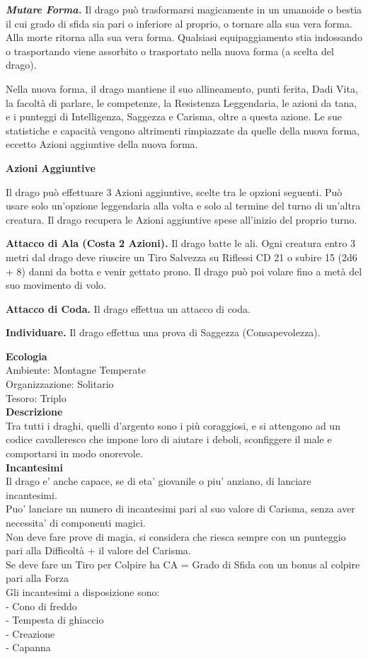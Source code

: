 \begin{multicols}{2}
\emph{\textbf{Mutare Forma.}} Il drago può trasformarsi magicamente in un umanoide o bestia il cui grado di sfida sia pari o inferiore al proprio, o tornare alla sua vera forma. Alla morte ritorna alla sua vera forma. Qualsiasi equipaggiamento stia indossando o trasportando viene assorbito o trasportato nella nuova forma (a scelta del drago).

Nella nuova forma, il drago mantiene il suo allineamento, punti ferita, Dadi Vita, la facoltà di parlare, le competenze, la Resistenza Leggendaria, le azioni da tana, e i punteggi di Intelligenza, Saggezza e Carisma, oltre a questa azione. Le sue statistiche e capacità vengono altrimenti rimpiazzate da quelle della nuova forma, eccetto Azioni aggiuntive della nuova forma.

\textbf{Azioni Aggiuntive}

Il drago può effettuare 3 Azioni aggiuntive, scelte tra le opzioni seguenti. Può usare solo un'opzione leggendaria alla volta e solo al termine del turno di un'altra creatura. Il drago recupera le Azioni aggiuntive spese all'inizio del proprio turno.

\textbf{Attacco di Ala (Costa 2 Azioni).} Il drago batte le ali. Ogni creatura entro 3 metri dal drago deve riuscire un Tiro Salvezza su Riflessi CD 21 o subire 15 (2d6 + 8) danni da botta e venir gettato prono. Il drago può poi volare fino a metà del suo movimento di volo.

\textbf{Attacco di Coda.} Il drago effettua un attacco di coda.

\textbf{Individuare.} Il drago effettua una prova di Saggezza (Consapevolezza).

\textbf{Ecologia}\\
Ambiente: Montagne Temperate\\
Organizzazione: Solitario\\
Tesoro: Triplo\\
\textbf{Descrizione}\\
Tra tutti i draghi, quelli d'argento sono i più coraggiosi, e si attengono ad un codice cavalleresco che impone loro di aiutare i deboli, sconfiggere il male e comportarsi in modo onorevole.\\
\textbf{Incantesimi}\\
Il drago e' anche capace, se di eta' giovanile o piu' anziano, di lanciare incantesimi.\\
Puo' lanciare un numero di incantesimi pari al suo valore di Carisma, senza aver necessita' di componenti magici.\\
Non deve fare prove di magia, si considera che riesca sempre con un punteggio pari alla Difficoltà + il valore del Carisma.\\
Se deve fare un Tiro per Colpire ha CA = Grado di Sfida con un bonus al colpire pari alla Forza\\
Gli incantesimi a disposizione sono:\\
- Cono di freddo\\
- Tempesta di ghiaccio\\
- Creazione\\
- Capanna\\


\end{multicols}
